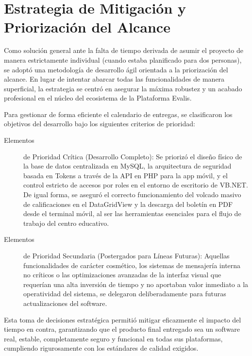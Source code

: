\documentclass[spanish]{report}
\begin{document}
\section{Estrategia de Mitigación y Priorización del Alcance}

Como solución general ante la falta de tiempo derivada de asumir el
proyecto de manera estrictamente individual (cuando estaba planificado
para dos personas), se adoptó una metodología de desarrollo ágil orientada
a la priorización del alcance. En lugar de intentar abarcar todas
las funcionalidades de manera superficial, la estrategia se centró
en asegurar la máxima robustez y un acabado profesional en el núcleo
del ecosistema de la Plataforma Evalis.

Para gestionar de forma eficiente el calendario de entregas, se clasificaron
los objetivos del desarrollo bajo los siguientes criterios de prioridad:
\begin{description}
\item [{Elementos}] de Prioridad Crítica (Desarrollo Completo): Se priorizó
el diseño físico de la base de datos centralizada en MySQL, la arquitectura
de seguridad basada en Tokens a través de la API en PHP para la app
móvil, y el control estricto de accesos por roles en el entorno de
escritorio de VB.NET. De igual forma, se aseguró el correcto funcionamiento
del volcado masivo de calificaciones en el DataGridView y la descarga
del boletín en PDF desde el terminal móvil, al ser las herramientas
esenciales para el flujo de trabajo del centro educativo.
\item [{Elementos}] de Prioridad Secundaria (Postergados para Líneas Futuras):
Aquellas funcionalidades de carácter cosmético, los sistemas de mensajería
interna no críticos o las optimizaciones avanzadas de la interfaz
visual que requerían una alta inversión de tiempo y no aportaban valor
inmediato a la operatividad del sistema, se delegaron deliberadamente
para futuras actualizaciones del software.
\end{description}
Esta toma de decisiones estratégica permitió mitigar eficazmente el
impacto del tiempo en contra, garantizando que el producto final entregado
sea un software real, estable, completamente seguro y funcional en
todas sus plataformas, cumpliendo rigurosamente con los estándares
de calidad exigidos.


\end{document}
